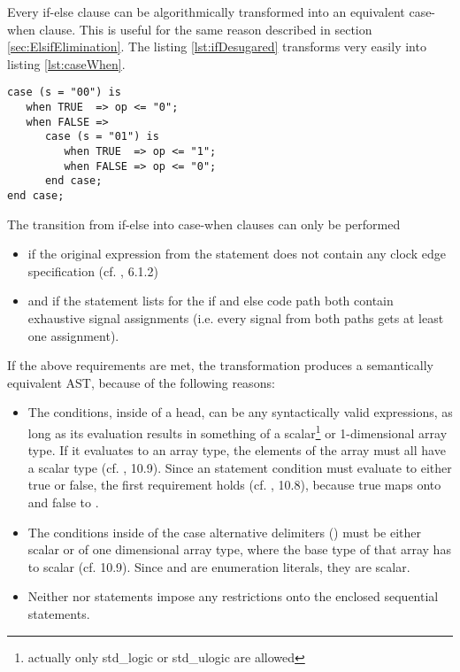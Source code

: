 Every if-else clause can be algorithmically transformed into an
equivalent case-when clause.
This is useful for the same reason described in section
\ref{sec:ElsifElimination}.
The listing \ref{lst:ifDesugared} transforms very easily into listing
\ref{lst:caseWhen}.
%
\begin{lstlisting}[style=vhdl,caption={Generated case when
      statement},label={lst:caseWhen}]
case (s = "00") is
   when TRUE  => op <= "0";
   when FALSE =>
      case (s = "01") is
         when TRUE  => op <= "1";
         when FALSE => op <= "0";
      end case;
end case;
\end{lstlisting}
%
The transition from if-else into case-when clauses can only be
performed
\begin{itemize}
    \item if the original expression from the  statement does not
    contain any clock edge specification (cf. \cite{IEEESYNTH}, 6.1.2)
    \item and if the statement lists for the if and  else code path
    both contain exhaustive signal assignments (i.e. every signal from
    both paths gets at least one assignment).
\end{itemize}
%
If the above requirements are met, the transformation produces a
semantically equivalent AST, because of the following reasons:
\begin{itemize}
    \item The conditions, inside of a  head, can be
    any syntactically valid expressions, as long as its evaluation
    results in something of a scalar\footnote{actually only std_logic
      or std_ulogic are allowed} or 1-dimensional array type. If
    it evaluates to an array type, the elements of the array must all
    have a scalar type (cf. \cite{IEEELRM}, 10.9). Since an 
    statement condition must evaluate to either true or false, the
    first requirement holds (cf. \cite{IEEELRM}, 10.8), because true
    maps onto  and false to .
    \item The conditions inside of the case alternative delimiters
    () must be
    either scalar or of one dimensional array type, where the base
    type of that array has to scalar (cf. \cite{IEEELRM} 10.9). Since
     and  are
    enumeration literals, they are scalar.
    \item Neither  nor  statements impose any
    restrictions onto the enclosed sequential statements.
\end{itemize}

